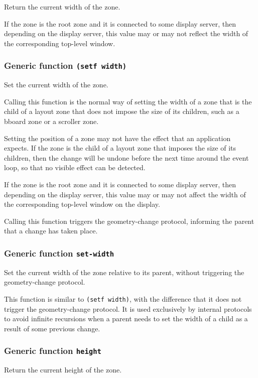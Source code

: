 \documentclass{report}
\begin{document}
Return the current width of the zone.  

If the zone is the root zone and it is connected to some display
server, then depending on the display server, this value may or
may not reflect the width of the corresponding top-level window.

\subsubsection{Generic function \texttt{(setf width)}}

Set the current width of the zone.

Calling this function is the normal way of setting the width of a
zone that is the child of a layout zone that does not impose the
size of its children, such as a bboard zone or a scroller zone.

Setting the position of a zone may not have the effect that an
application expects.  If the zone is the child of a layout zone
that imposes the size of its children, then the change will be
undone before the next time around the event loop, so that no
visible effect can be detected.

If the zone is the root zone and it is connected to some display
server, then depending on the display server, this value may or
may not affect the width of the corresponding top-level window
on the display.

Calling this function triggers the geometry-change protocol,
informing the parent that a change has taken place.  

\subsubsection{Generic function \texttt{set-width}}

Set the current width of the zone relative to its parent, without
triggering the geometry-change protocol.

This function is similar to \texttt{(setf width)}, with the difference
that it does not trigger the geometry-change protocol.  It is used
exclusively by internal protocols to avoid infinite recursions when a
parent needs to set the width of a child as a result of some previous
change.

\subsubsection{Generic function \texttt{height}}

Return the current height of the zone.
\end{document}
